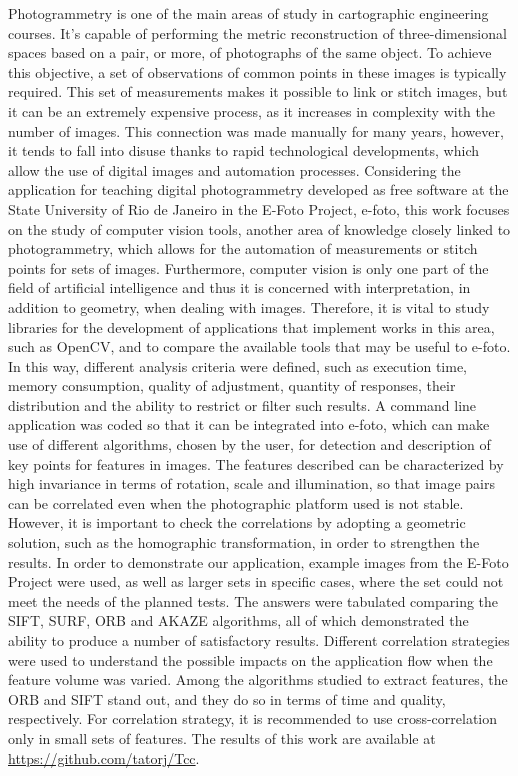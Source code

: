 
\doreference

Photogrammetry is one of the main areas of study in cartographic engineering courses. It's capable of performing the metric reconstruction of three-dimensional spaces based on a pair, or more, of photographs of the same object.
To achieve this objective, a set of observations of common points in these images is typically required.
This set of measurements makes it possible to link or stitch images, but it can be an extremely expensive process, as it increases in complexity with the number of images. This connection was made manually for many years, however, it tends to fall into disuse thanks to rapid technological developments, which allow the use of digital images and automation processes.
Considering the application for teaching digital photogrammetry developed as free software at the State University of Rio de Janeiro in the E-Foto Project, e-foto, this work focuses on the study of computer vision tools, another area of knowledge closely linked to photogrammetry, which allows for the automation of measurements or stitch points for sets of images. Furthermore, computer vision is only one part of the field of artificial intelligence and thus it is concerned with interpretation, in addition to geometry, when dealing with images.
Therefore, it is vital to study libraries for the development of applications that implement works in this area, such as OpenCV, and to compare the available tools that may be useful to e-foto. In this way, different analysis criteria were defined, such as execution time, memory consumption, quality of adjustment, quantity of responses, their distribution and the ability to restrict or filter such results. A command line application was coded so that it can be integrated into e-foto, which can make use of different algorithms, chosen by the user, for detection and description of key points for features in images. The features described can be characterized by high invariance in terms of rotation, scale and illumination, so that image pairs can be correlated even when the photographic platform used is not stable. However, it is important to check the correlations by adopting a geometric solution, such as the homographic transformation, in order to strengthen the results.
In order to demonstrate our application, example images from the E-Foto Project were used, as well as larger sets in specific cases, where the set could not meet the needs of the planned tests. The answers were tabulated comparing the SIFT, SURF, ORB and AKAZE algorithms, all of which demonstrated the ability to produce a number of satisfactory results. Different correlation strategies were used to understand the possible impacts on the application flow when the feature volume was varied.
Among the algorithms studied to extract features, the ORB and SIFT stand out, and they do so in terms of time and quality, respectively. For correlation strategy, it is recommended to use cross-correlation only in small sets of features.
The results of this work are available at \url{https://github.com/tatorj/Tcc}.

\printkeys